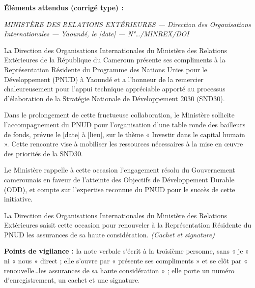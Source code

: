 \documentclass[11pt]{article}
\begin{document}
\begin{corrige}
\textbf{Éléments attendus (corrigé type) :}

\textit{MINISTÈRE DES RELATIONS EXTÉRIEURES — Direction des Organisations Internationales — Yaoundé, le [date] — N°\ldots/MINREX/DOI}

La Direction des Organisations Internationales du Ministère des Relations Extérieures de la République du Cameroun présente ses compliments à la Représentation Résidente du Programme des Nations Unies pour le Développement (PNUD) à Yaoundé et a l'honneur de la remercier chaleureusement pour l'appui technique appréciable apporté au processus d'élaboration de la Stratégie Nationale de Développement 2030 (SND30).

Dans le prolongement de cette fructueuse collaboration, le Ministère sollicite l'accompagnement du PNUD pour l'organisation d'une table ronde des bailleurs de fonds, prévue le [date] à [lieu], sur le thème « Investir dans le capital humain ». Cette rencontre vise à mobiliser les ressources nécessaires à la mise en œuvre des priorités de la SND30.

Le Ministère rappelle à cette occasion l'engagement résolu du Gouvernement camerounais en faveur de l'atteinte des Objectifs de Développement Durable (ODD), et compte sur l'expertise reconnue du PNUD pour le succès de cette initiative.

La Direction des Organisations Internationales du Ministère des Relations Extérieures saisit cette occasion pour renouveler à la Représentation Résidente du PNUD les assurances de sa haute considération. \textit{(Cachet et signature)}

\textbf{Points de vigilance :} la note verbale s'écrit à la troisième personne, sans « je » ni « nous » direct ; elle s'ouvre par « présente ses compliments » et se clôt par « renouvelle\ldots les assurances de sa haute considération » ; elle porte un numéro d'enregistrement, un cachet et une signature.
\end{corrige}
\end{document}
